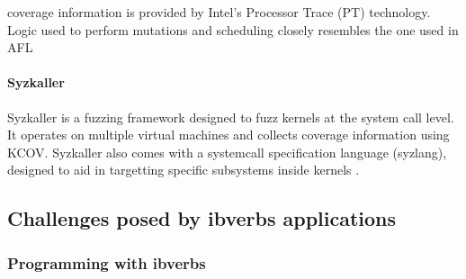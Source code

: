 coverage information is provided by Intel's Processor Trace (PT) technology. Logic used to perform
mutations and scheduling closely resembles the one used in AFL\cite{kafl}

\paragraph{Syzkaller}

Syzkaller is a fuzzing framework designed to fuzz kernels at the system call level. It operates on multiple
virtual machines and collects coverage information using KCOV. Syzkaller also comes with a systemcall specification
language (syzlang), designed to aid in targetting specific subsystems inside kernels \cite{syzkaller}.

\subsection{Challenges posed by ibverbs applications}

\subsubsection{Programming with ibverbs}








